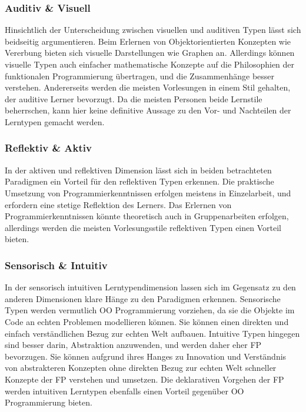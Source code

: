 \subsubsection{Auditiv & Visuell}
Hinsichtlich der Unterscheidung zwischen visuellen und auditiven Typen lässt sich beidseitig argumentieren. Beim Erlernen von Objektorientierten Konzepten wie Vererbung bieten sich visuelle Darstellungen wie Graphen an. Allerdings können visuelle Typen auch einfacher mathematische Konzepte auf die Philosophien der funktionalen Programmierung übertragen, und die Zusammenhänge besser verstehen.
Andererseits werden die meisten Vorlesungen in einem Stil gehalten, der auditive Lerner bevorzugt. Da die meisten Personen beide Lernstile beherrschen, kann hier keine definitive Aussage zu den Vor- und Nachteilen der Lerntypen gemacht werden.

\subsubsection{Reflektiv & Aktiv}
In der aktiven und reflektiven Dimension lässt sich in beiden betrachteten Paradigmen ein Vorteil für den reflektiven Typen erkennen. Die praktische Umsetzung von Programmierkenntnissen erfolgen meistens in Einzelarbeit, und erfordern eine stetige Reflektion des Lerners.
Das Erlernen von Programmierkenntnissen könnte theoretisch auch in Gruppenarbeiten erfolgen, allerdings werden die meisten Vorlesungsstile reflektiven Typen einen Vorteil bieten. %

\subsubsection{Sensorisch & Intuitiv}
In der sensorisch intuitiven Lerntypendimension lassen sich im Gegensatz zu den anderen Dimensionen klare Hänge zu den Paradigmen erkennen.
Sensorische Typen werden vermutlich OO Programmierung vorziehen, da sie die Objekte im Code an echten Problemen modellieren können. Sie können einen direkten und einfach verständlichen Bezug zur echten Welt aufbauen.
Intuitive Typen hingegen sind besser darin, Abstraktion anzuwenden, und werden daher eher FP bevorzugen. Sie können aufgrund ihres Hanges zu Innovation und Verständnis von abstrakteren Konzepten ohne direkten Bezug zur echten Welt schneller Konzepte der FP verstehen und umsetzen. Die deklarativen Vorgehen der FP werden intuitiven Lerntypen ebenfalls einen Vorteil gegenüber OO Programmierung bieten.

